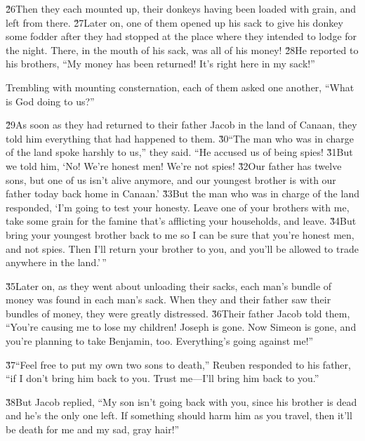 \v{26}Then they each mounted up, their donkeys having been loaded with grain, and left from there. \v{27}Later on, one of them opened up his sack to give his donkey some fodder after they had stopped at the place where they intended to lodge for the night. There, in the mouth of his sack, was all of his money! \v{28}He reported to his brothers, ``My money has been returned! It's right here in my sack!''

Trembling with mounting consternation, each of them asked one another, ``What is God doing to us?''

\v{29}As soon as they had returned to their father Jacob in the land of Canaan, they told him everything that had happened to them. \v{30}``The man who was in charge of the land spoke harshly to us,'' they said. ``He accused us of being spies! \v{31}But we told him, `No! We're honest men! We're not spies! \v{32}Our father has twelve sons, but one of us isn't alive anymore, and our youngest brother is with our father today back home in Canaan.' \v{33}But the man who was in charge of the land responded, `I'm going to test your honesty. Leave one of your brothers with me, take some grain for the famine that's afflicting your households, and leave. \v{34}But bring your youngest brother back to me so I can be sure that you're honest men, and not spies. Then I'll return your brother to you, and you'll be allowed to trade anywhere in the land.'\,''

\v{35}Later on, as they went about unloading their sacks, each man's bundle of money was found in each man's sack. When they and their father saw their bundles of money, they were greatly distressed. \v{36}Their father Jacob told them, ``You're causing me to lose my children! Joseph is gone. Now Simeon is gone, and you're planning to take Benjamin, too. Everything's going against me!''

\v{37}``Feel free to put my own two sons to death,'' Reuben responded to his father, ``if I don't bring him back to you. Trust me---I'll bring him back to you.''

\v{38}But Jacob replied, ``My son isn't going back with you, since his brother is dead and he's the only one left. If something should harm him as you travel, then it'll be death for me and my sad, gray hair!''

